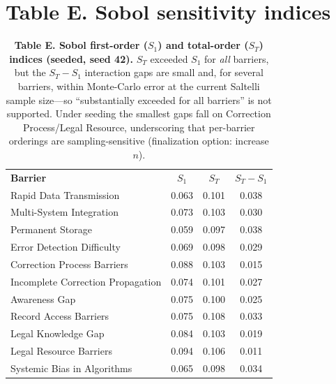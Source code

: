 \documentclass[10pt,letterpaper]{article}
\newlength\savedwidth
\newcommand\thickhline{\noalign{\global\savedwidth\arrayrulewidth\global\arrayrulewidth 2pt}\hline\noalign{\global\arrayrulewidth\savedwidth}}
\begin{document}
\section*{Table E. Sobol sensitivity indices}
\begin{table}[!ht]\centering
\caption{{\bf Table E. Sobol first-order ($S_1$) and total-order ($S_T$) indices (seeded, seed 42).} $S_T$ exceeded $S_1$ for \emph{all} barriers, but the $S_T-S_1$ interaction gaps are small and, for several barriers, within Monte-Carlo error at the current Saltelli sample size---so ``substantially exceeded for all barriers'' is not supported. Under seeding the smallest gaps fall on Correction Process/Legal Resource, underscoring that per-barrier orderings are sampling-sensitive (finalization option: increase $n$).}
\label{S5}
\begin{tabular}{l c c c}
\hline \textbf{Barrier} & \textbf{$S_1$} & \textbf{$S_T$} & \textbf{$S_T-S_1$} \\ \thickhline
Rapid Data Transmission & 0.063 & 0.101 & 0.038 \\
Multi-System Integration & 0.073 & 0.103 & 0.030 \\
Permanent Storage & 0.059 & 0.097 & 0.038 \\
Error Detection Difficulty & 0.069 & 0.098 & 0.029 \\
Correction Process Barriers & 0.088 & 0.103 & 0.015 \\
Incomplete Correction Propagation & 0.074 & 0.101 & 0.027 \\
Awareness Gap & 0.075 & 0.100 & 0.025 \\
Record Access Barriers & 0.075 & 0.108 & 0.033 \\
Legal Knowledge Gap & 0.084 & 0.103 & 0.019 \\
Legal Resource Barriers & 0.094 & 0.106 & 0.011 \\
Systemic Bias in Algorithms & 0.065 & 0.098 & 0.034 \\ \hline
\end{tabular}
\end{table}

\end{document}
